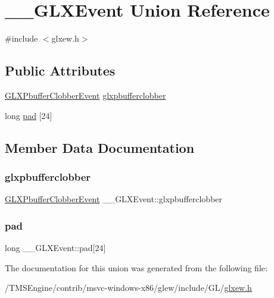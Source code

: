 \hypertarget{union_____g_l_x_event}{}\section{\+\_\+\+\_\+\+G\+L\+X\+Event Union Reference}
\label{union_____g_l_x_event}


{\ttfamily \#include $<$glxew.\+h$>$}

\subsection*{Public Attributes}
\begin{DoxyCompactItemize}
\item 
\hyperlink{struct_g_l_x_pbuffer_clobber_event}{G\+L\+X\+Pbuffer\+Clobber\+Event} \hyperlink{union_____g_l_x_event_ada5880e2b424bcb2f60a411aaf713fae}{glxpbufferclobber}
\item 
long \hyperlink{union_____g_l_x_event_a1cb8f6e7e77a34d25baf43b3f3bc2d4f}{pad} \mbox{[}24\mbox{]}
\end{DoxyCompactItemize}


\subsection{Member Data Documentation}
\mbox{\label{union_____g_l_x_event_ada5880e2b424bcb2f60a411aaf713fae}} 
\subsubsection{\texorpdfstring{glxpbufferclobber}{glxpbufferclobber}}
{\footnotesize\ttfamily \hyperlink{struct_g_l_x_pbuffer_clobber_event}{G\+L\+X\+Pbuffer\+Clobber\+Event} \+\_\+\+\_\+\+G\+L\+X\+Event\+::glxpbufferclobber}

\mbox{\label{union_____g_l_x_event_a1cb8f6e7e77a34d25baf43b3f3bc2d4f}} 
\subsubsection{\texorpdfstring{pad}{pad}}
{\footnotesize\ttfamily long \+\_\+\+\_\+\+G\+L\+X\+Event\+::pad\mbox{[}24\mbox{]}}



The documentation for this union was generated from the following file\+:\begin{DoxyCompactItemize}
\item 
/\+T\+M\+S\+Engine/contrib/msvc-\/windows-\/x86/glew/include/\+G\+L/\hyperlink{glxew_8h}{glxew.\+h}\end{DoxyCompactItemize}

